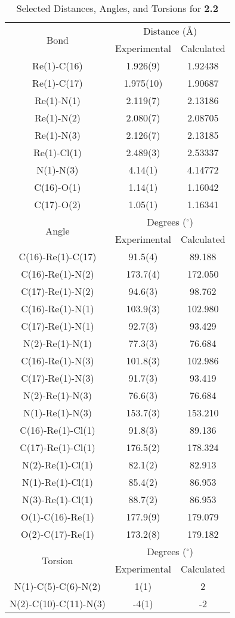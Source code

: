 \begin{table}[htbp]
  \caption{Selected Distances, Angles, and Torsions for \textbf{2.2}}
  \centering
    \begin{tabular}{ccc}
    \toprule
    \multirow{2}{*}{Bond} & \multicolumn{2}{c}{Distance (\r{A})} \\ \cline{2-3}
     & Experimental & Calculated \\ \midrule
    Re(1)-C(16) & 1.926(9) & 1.92438\\
    Re(1)-C(17) & 1.975(10) & 1.90687\\
    Re(1)-N(1) & 2.119(7) & 2.13186\\
    Re(1)-N(2) & 2.080(7) & 2.08705\\
    Re(1)-N(3) & 2.126(7) & 2.13185\\
    Re(1)-Cl(1) & 2.489(3) & 2.53337 \\
    N(1)-N(3) & 4.14(1) & 4.14772 \\ 
    C(16)-O(1) & 1.14(1) & 1.16042 \\
    C(17)-O(2) & 1.05(1) & 1.16341 \\ \midrule
    \multirow{2}{*}{Angle} & \multicolumn{2}{c}{Degrees ($^\circ$)} \\ \cline{2-3}
     & Experimental & Calculated \\ \midrule
    C(16)-Re(1)-C(17) & 91.5(4) & 89.188 \\
    C(16)-Re(1)-N(2) & 173.7(4) & 172.050 \\
    C(17)-Re(1)-N(2) & 94.6(3) & 98.762 \\
    C(16)-Re(1)-N(1) & 103.9(3) & 102.980 \\
    C(17)-Re(1)-N(1) & 92.7(3) & 93.429 \\
    N(2)-Re(1)-N(1) & 77.3(3) & 76.684 \\
    C(16)-Re(1)-N(3) & 101.8(3) & 102.986 \\
    C(17)-Re(1)-N(3) & 91.7(3) & 93.419 \\
    N(2)-Re(1)-N(3) & 76.6(3) & 76.684 \\
    N(1)-Re(1)-N(3) & 153.7(3) & 153.210 \\
    C(16)-Re(1)-Cl(1) & 91.8(3) & 89.136 \\
    C(17)-Re(1)-Cl(1) & 176.5(2) & 178.324 \\
    N(2)-Re(1)-Cl(1) & 82.1(2) & 82.913 \\
    N(1)-Re(1)-Cl(1) & 85.4(2) & 86.953 \\
    N(3)-Re(1)-Cl(1) & 88.7(2) & 86.953 \\
    O(1)-C(16)-Re(1) & 177.9(9) & 179.079 \\
    O(2)-C(17)-Re(1) & 173.2(8) & 179.182 \\ \midrule
    \multirow{2}{*}{Torsion} & \multicolumn{2}{c}{Degrees ($^\circ$)} \\ \cline{2-3}
     & Experimental & Calculated \\ \midrule
    N(1)-C(5)-C(6)-N(2) & 1(1) & 2 \\
    N(2)-C(10)-C(11)-N(3) & -4(1) & -2 \\
    \bottomrule
    \end{tabular}%
  \label{tab.da2}%
\end{table}%


